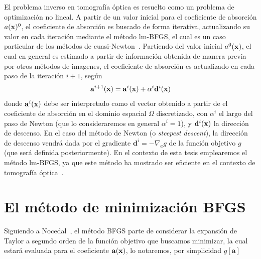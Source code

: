 El problema inverso en tomografía óptica es resuelto como un problema de optimización 
no lineal. A partir de un valor inicial para el coeficiente de absorción $a(\mathbf{x})^0$, 
el coeficiente de absorción es buscado de forma iterativa, actualizando su valor 
en cada iteración mediante el método lm-BFGS, el cual es un caso particular 
de los métodos de cuasi-Newton~\cite{Nocedal2006,Klose2003QN,Ren2006}. 
Partiendo del valor inicial $a^0(\mathbf{x})$, el cual en general es estimado 
a partir de información obtenida de manera previa por otros métodos de imagenes, 
el coeficiente de absorción es 
\clearpage
\noindent actualizado en cada paso de la iteración $i+1$, según~\cite{Klose2003QN}
\begin{equation}
\mathbf{a}^{i+1}(\mathbf{x})=\mathbf{a}^{i}(\mathbf{x})+\alpha^i  \mathbf{d}^i(\mathbf{x})
\label{eq:update}
\end{equation}
donde $\mathbf{a}^{i}(\mathbf{x})$ debe ser interpretado como el 
vector obtenido a partir de el coeficiente de absorción en el 
dominio espacial $\Omega$  
discretizado, con $\alpha^i$ el largo del paso de Newton (que lo consideraremos 
en general $\alpha^i=1$), y $\mathbf{d}^i(\mathbf{x})$ 
la dirección de descenso. En el caso del método de Newton (o {\em steepest descent}), la dirección de 
descenso vendrá dada por el gradiente $\mathbf{d}^i=-\nabla_a g$ de la función objetivo $g$ (que será definida posteriormente). 
En el contexto de esta tesis emplearemos el método lm-BFGS, ya que este método ha 
mostrado ser eficiente en el contexto de tomografía óptica~\cite{Klose2003QN,Ren2006,
Prieto2017}. 

\section{El método de minimización BFGS}
\label{sec:BFGS}
Siguiendo a Nocedal~\cite{Nocedal2006}, el método BFGS parte de considerar la expansión de Taylor a segundo orden de la función objetivo 
que buscamos minimizar, la cual estará evaluada para el coeficiente $\mathbf{a}(\mathbf{x})$,  
lo notaremos, por simplicidad  $g[\mathbf{a}]$

